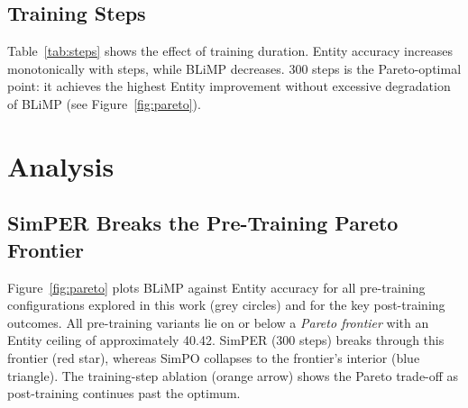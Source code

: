 \documentclass[11pt]{article}
\begin{document}
\subsection{Training Steps}

Table~\ref{tab:steps} shows the effect of training duration.
Entity accuracy increases monotonically with steps, while
BLiMP decreases.
300 steps is the Pareto-optimal point: it achieves the highest
Entity improvement without excessive degradation of BLiMP
(see Figure~\ref{fig:pareto}).

\begin{table}[t]
\centering
\small
{}
\caption{Effect of SimPER training steps (full 20\,000-pair dataset).
300 steps is the Pareto-optimal point for BLiMP vs.\ Entity.}
\label{tab:steps}
\end{table}

\section{Analysis}
\label{sec:analysis}

\subsection{SimPER Breaks the Pre-Training Pareto Frontier}

Figure~\ref{fig:pareto} plots BLiMP against Entity accuracy
for all pre-training configurations explored in this work
(grey circles) and for the key post-training outcomes.
All pre-training variants lie on or below a
\emph{Pareto frontier} with an Entity ceiling of approximately 40.42.
SimPER (300 steps) breaks through this frontier (red star),
whereas SimPO collapses to the frontier's interior (blue triangle).
The training-step ablation (orange arrow) shows the
Pareto trade-off as post-training continues past the optimum.
\end{document}
